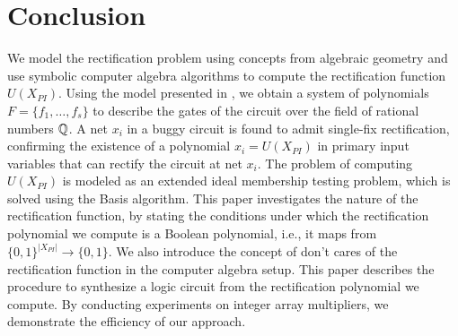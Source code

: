 \vspace{-0.1in} 
\section{Conclusion}
\label{sec:conclude}

We model the rectification problem using concepts from
algebraic geometry and use symbolic computer algebra algorithms to compute the rectification function $U(X_{PI})$. Using the model presented in \cite{Armin2017ColumnWiseVO}, we obtain a system of polynomials $F = \{f_1,\dots,f_s\}$ to describe the gates of the circuit over the field of rational numbers ${\mathbb{Q}}$. A net $x_i$ in a buggy circuit is found to admit single-fix rectification, confirming the existence of a polynomial $x_i = U(X_{PI})$ in primary input variables that can rectify the circuit at net $x_i$. The problem of computing $U(X_{PI})$ is modeled as an extended ideal membership testing problem, which is
solved using the \Grobner Basis algorithm. This paper investigates the nature of the rectification function, by stating the conditions under which the rectification polynomial we compute is a Boolean polynomial, i.e., it maps from $\{0,1\}^{|X_{PI}|}\rightarrow \{0,1\}$. We also introduce the concept of don't cares of the rectification function in the computer algebra setup. This paper describes the procedure to synthesize a logic circuit from the rectification polynomial we compute. By conducting experiments on integer array multipliers, we demonstrate the efficiency of our approach. 
